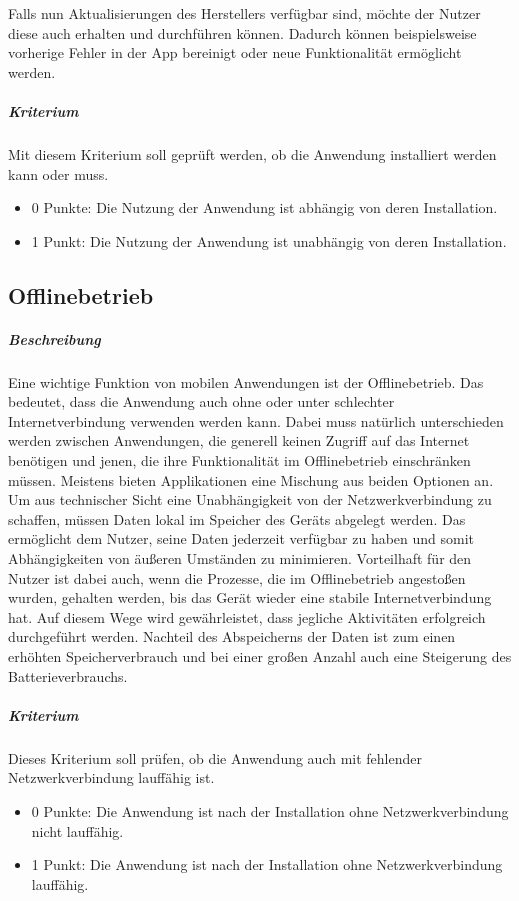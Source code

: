 Falls nun Aktualisierungen des Herstellers verfügbar sind, möchte der Nutzer diese auch erhalten und durchführen können.
Dadurch können beispielsweise vorherige Fehler in der App bereinigt oder neue Funktionalität ermöglicht werden.

\subparagraph{Kriterium\\}
Mit diesem Kriterium soll geprüft werden, ob die Anwendung installiert werden kann oder muss.

\begin{itemize}
\item 0 Punkte: Die Nutzung der Anwendung ist abhängig von deren Installation.
\item 1 Punkt: Die Nutzung der Anwendung ist unabhängig von deren Installation.
\end{itemize}

\subsection{Offlinebetrieb}
\subparagraph{Beschreibung\\}
Eine wichtige Funktion von mobilen Anwendungen ist der Offlinebetrieb.
Das bedeutet, dass die Anwendung auch ohne oder unter schlechter Internetverbindung verwenden werden kann.
Dabei muss natürlich unterschieden werden zwischen Anwendungen, die generell keinen Zugriff auf das Internet benötigen und jenen, die ihre Funktionalität im Offlinebetrieb einschränken müssen.
Meistens bieten Applikationen eine Mischung aus beiden Optionen an.
Um aus technischer Sicht eine Unabhängigkeit von der Netzwerkverbindung zu schaffen, müssen Daten lokal im Speicher des Geräts abgelegt werden.
Das ermöglicht dem Nutzer, seine Daten jederzeit verfügbar zu haben und somit Abhängigkeiten von äußeren Umständen zu minimieren.
Vorteilhaft für den Nutzer ist dabei auch, wenn die Prozesse, die im Offlinebetrieb angestoßen wurden, gehalten werden, bis das Gerät wieder eine stabile Internetverbindung hat.
Auf diesem Wege wird gewährleistet, dass jegliche Aktivitäten erfolgreich durchgeführt werden.
Nachteil des Abspeicherns der Daten ist zum einen erhöhten Speicherverbrauch und bei einer großen Anzahl auch eine Steigerung des Batterieverbrauchs.

\subparagraph{Kriterium\\}
Dieses Kriterium soll prüfen, ob die Anwendung auch mit fehlender Netzwerkverbindung lauffähig ist.

\begin{itemize}
\item 0 Punkte: Die Anwendung ist nach der Installation ohne Netzwerkverbindung nicht lauffähig.
\item 1 Punkt: Die Anwendung ist nach der Installation ohne Netzwerkverbindung lauffähig.
\end{itemize}

